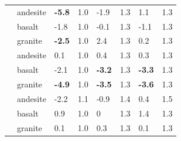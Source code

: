 \documentclass[english,man,floatsintext]{apa6}
\begin{document}
\begin{longtable}[t]{lllrlrlr}
\endfoot
\bottomrule
\endlastfoot
 & andesite & \textbf{-5.8} & 1.0 & -1.9 & 1.3 & 1.1 & 1.3\\
\nopagebreak
 & basalt & -1.8 & 1.0 & -0.1 & 1.3 & -1.1 & 1.3\\
\nopagebreak
\multirow[t]{-3}{*}{\raggedright\arraybackslash warm} & granite & \textbf{-2.5} & 1.0 & 2.4 & 1.3 & 0.2 & 1.3\\
\cmidrule{1-8}\pagebreak[0]
 & andesite & 0.1 & 1.0 & 0.4 & 1.3 & 0.3 & 1.3\\
\nopagebreak
 & basalt & -2.1 & 1.0 & \textbf{-3.2} & 1.3 & \textbf{-3.3} & 1.3\\
\nopagebreak
\multirow[t]{-3}{*}{\raggedright\arraybackslash cool} & granite & \textbf{-4.9} & 1.0 & \textbf{-3.5} & 1.3 & \textbf{-3.6} & 1.3\\
\cmidrule{1-8}\pagebreak[0]
 & andesite & -2.2 & 1.1 & -0.9 & 1.4 & 0.4 & 1.5\\
\nopagebreak
 & basalt & 0.9 & 1.0 & 0 & 1.3 & 1.4 & 1.3\\
\nopagebreak
\multirow[t]{-3}{*}{\raggedright\arraybackslash cold} & granite & 0.1 & 1.0 & 0.3 & 1.3 & 0.1 & 1.3\\*
\end{longtable}
\endgroup{}



\begingroup\fontsize{10}{12}\selectfont
\end{document}
